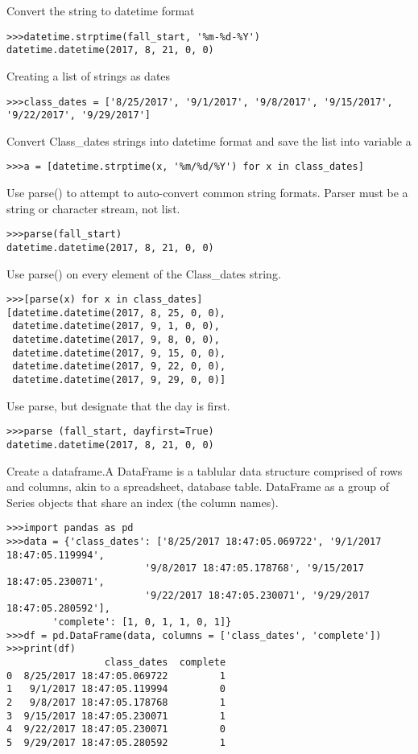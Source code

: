 Convert the string to datetime format

\begin{verbatim}
>>>datetime.strptime(fall_start, '%m-%d-%Y')
datetime.datetime(2017, 8, 21, 0, 0)
\end{verbatim}

Creating a list of strings as dates

\begin{verbatim}
>>>class_dates = ['8/25/2017', '9/1/2017', '9/8/2017', '9/15/2017', '9/22/2017', '9/29/2017']
\end{verbatim}

Convert Class\_dates strings into datetime format and save the list into
variable a

\begin{verbatim}
>>>a = [datetime.strptime(x, '%m/%d/%Y') for x in class_dates]
\end{verbatim}

Use parse() to attempt to auto-convert common string formats. Parser
must be a string or character stream, not list.

\begin{verbatim}
>>>parse(fall_start)
datetime.datetime(2017, 8, 21, 0, 0)
\end{verbatim}

Use parse() on every element of the Class\_dates string.

\begin{verbatim}
>>>[parse(x) for x in class_dates] 
[datetime.datetime(2017, 8, 25, 0, 0),
 datetime.datetime(2017, 9, 1, 0, 0),
 datetime.datetime(2017, 9, 8, 0, 0),
 datetime.datetime(2017, 9, 15, 0, 0),
 datetime.datetime(2017, 9, 22, 0, 0),
 datetime.datetime(2017, 9, 29, 0, 0)]  
\end{verbatim}

Use parse, but designate that the day is first.

\begin{verbatim}
>>>parse (fall_start, dayfirst=True)
datetime.datetime(2017, 8, 21, 0, 0)
\end{verbatim}

Create a dataframe.A DataFrame is a tablular data structure comprised of
rows and columns, akin to a spreadsheet, database table. DataFrame as a
group of Series objects that share an index (the column names).

\begin{verbatim}
>>>import pandas as pd
>>>data = {'class_dates': ['8/25/2017 18:47:05.069722', '9/1/2017 18:47:05.119994', 
                        '9/8/2017 18:47:05.178768', '9/15/2017 18:47:05.230071', 
                        '9/22/2017 18:47:05.230071', '9/29/2017 18:47:05.280592'], 
        'complete': [1, 0, 1, 1, 0, 1]} 
>>>df = pd.DataFrame(data, columns = ['class_dates', 'complete'])
>>>print(df)
                 class_dates  complete
0  8/25/2017 18:47:05.069722         1
1   9/1/2017 18:47:05.119994         0
2   9/8/2017 18:47:05.178768         1
3  9/15/2017 18:47:05.230071         1
4  9/22/2017 18:47:05.230071         0
5  9/29/2017 18:47:05.280592         1
\end{verbatim}


